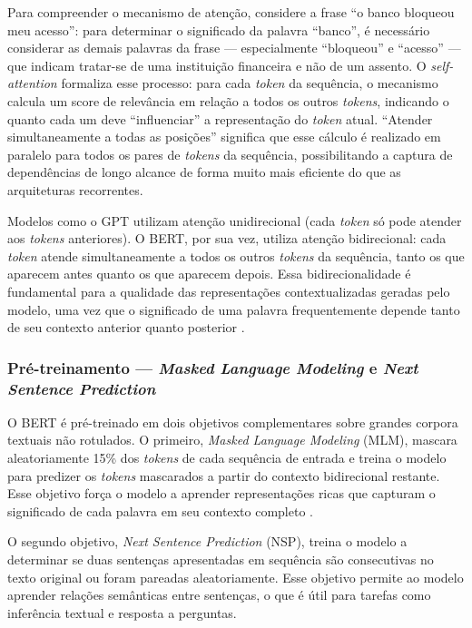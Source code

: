 \documentclass[
    12pt,                %
    openright,           %
    oneside,             %
    a4paper,             %
    english,             %
    brazil               %
]{abntex2}
\begin{document}
Para compreender o mecanismo de atenção, considere a frase ``o banco bloqueou 
meu acesso'': para determinar o significado da palavra ``banco'', é necessário 
considerar as demais palavras da frase — especialmente ``bloqueou'' e ``acesso'' 
— que indicam tratar-se de uma instituição financeira e não de um assento. O 
\textit{self-attention} formaliza esse processo: para cada \textit{token} da 
sequência, o mecanismo calcula um score de relevância em relação a todos os 
outros \textit{tokens}, indicando o quanto cada um deve ``influenciar'' a 
representação do \textit{token} atual. ``Atender simultaneamente a todas as 
posições'' significa que esse cálculo é realizado em paralelo para todos os 
pares de \textit{tokens} da sequência, possibilitando a captura de dependências 
de longo alcance de forma muito mais eficiente do que as arquiteturas recorrentes.

Modelos como o GPT utilizam atenção unidirecional (cada \textit{token} só pode 
atender aos \textit{tokens} anteriores). O BERT, por sua vez, utiliza atenção 
bidirecional: cada \textit{token} atende simultaneamente a todos os outros 
\textit{tokens} da sequência, tanto os que aparecem antes quanto os que aparecem 
depois. Essa bidirecionalidade é fundamental para a qualidade das representações 
contextualizadas geradas pelo modelo, uma vez que o significado de uma palavra 
frequentemente depende tanto de seu contexto anterior quanto posterior 
\cite{devlin2019}.

\subsubsection{Pré-treinamento — \textit{Masked Language Modeling} e \textit{Next Sentence Prediction}}
\label{subsubsec:bert_pretrain}

O BERT é pré-treinado em dois objetivos complementares sobre grandes corpora textuais não rotulados. O primeiro, \textit{Masked Language Modeling} (MLM), mascara aleatoriamente 15\% dos \textit{tokens} de cada sequência de entrada e treina o modelo para predizer os \textit{tokens} mascarados a partir do contexto bidirecional restante. Esse objetivo força o modelo a aprender representações ricas que capturam o significado de cada palavra em seu contexto completo \cite{devlin2019}.

O segundo objetivo, \textit{Next Sentence Prediction} (NSP), treina o modelo a determinar se duas sentenças apresentadas em sequência são consecutivas no texto original ou foram pareadas aleatoriamente. Esse objetivo permite ao modelo aprender relações semânticas entre sentenças, o que é útil para tarefas como inferência textual e resposta a perguntas.
\end{document}
